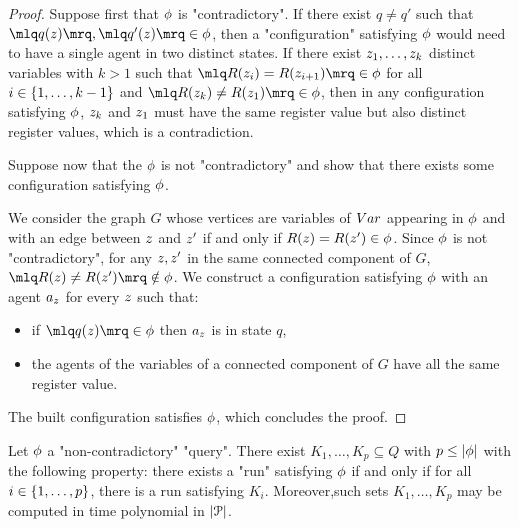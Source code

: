 \ifproofs
\begin{proof}
Suppose first that $\phi$ is "contradictory". If there exist $q \ne q'$ such that
 $\quotemarks{q(\varz)}, \quotemarks{q'(\varz)} \in \query$,  then a "configuration" satisfying $\phi$ would need to have a single agent in two distinct states. If there exist $\var{z_1}, \ldots, \var{z_k}$ distinct variables with $k>1$ such that $\quotemarks{R(\varz_{i}) = R(\varz_{i+1})} \in \query$ for all $i \in \{1,\ldots,k-1\}$ and $\quotemarks{R(\varz_k) \neq R(\varz_1)} \in \query$, then in any configuration satisfying $\phi$, $\varz_k$ and $\varz_1$ must have the same register value but also distinct register values, which is a contradiction. 

Suppose now that the $\phi$ is not "contradictory" and show that there exists some configuration satisfying $\phi$.

We consider the graph $G$ whose vertices are variables of $\varset$ appearing in $\phi$ and with an edge between $\varz$ and $\varz'$ if and only if $R(\varz) = R(\varz') \in \query$. Since $\phi$ is not "contradictory", for any $\varz, \varz'$ in the same connected component of $G$, $\quotemarks{R(\varz) \ne R(\varz')} \notin \query$. We construct a configuration satisfying $\phi$ with an agent $a_\varz$ for every $\varz$ such that:
\begin{itemize}
\item if $\quotemarks{q(\varz)} \in \query$ then $a_\varz$ is in state $q$,
\item the agents of the variables of a connected component of $G$ have all the same register value.  
\end{itemize}
The built configuration satisfies $\phi$, which concludes the proof. 
\end{proof}
\fi

\begin{lemma}
\label{lem:query-decomposition}
Let $\phi$ a  "non-contradictory" "query". There exist $K_1, \ldots, K_p \subseteq Q$ with $p \leq |\phi|$ with the following property: there exists a "run" satisfying $\phi$ if and only if for all $i \in \{1,\ldots, p\}$, there is a run satisfying $K_i$. Moreover,such sets $K_1, \dots, K_p$ may be computed in time polynomial in $|\mathcal{P}|$. 
\end{lemma}

